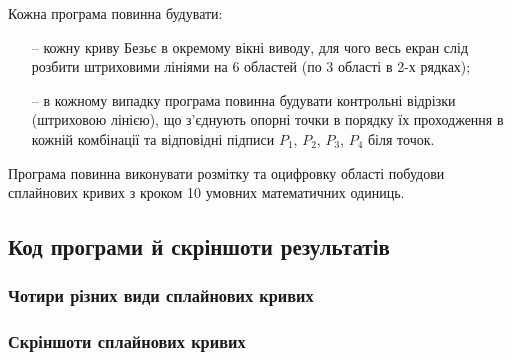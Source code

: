 \documentclass[a4paper,14pt]{extarticle} %
\begin{document}
\begin{enumerate}
    Кожна програма повинна будувати:

    \begin{itemize}
        \item[--] кожну криву Безьє в окремому вікні виводу, для чого весь екран слід розбити штриховими 
        лініями на 6 областей (по 3 області в 2-х рядках);  
        \item[--] в кожному випадку програма повинна будувати контрольні відрізки (штриховою лінією), що 
        з’єднують опорні точки в порядку їх проходження в кожній комбінації та відповідні підписи 
        $P_1$, $P_2$, $P_3$, $P_4$ біля точок.
    \end{itemize}

    Програма повинна виконувати розмітку та оцифровку області побудови сплайнових кривих з кроком 10 умовних математичних одиниць.

\end{enumerate}

\subsection*{Код програми й скріншоти результатів}

\subsubsection*{Чотири різних види сплайнових кривих}


\newpage
\subsubsection*{Скріншоти сплайнових кривих}

\begin{figure}[h]
\end{figure}
\end{document}
